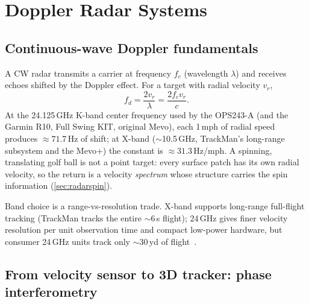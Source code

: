 \chapter{Doppler Radar Systems}
\label{ch:radar}

\section{Continuous-wave Doppler fundamentals}
\label{sec:cwdoppler}

A CW radar transmits a carrier at frequency $f_c$ (wavelength $\lambda$)
and receives echoes shifted by the Doppler effect. For a target with
radial velocity $v_r$,
\begin{equation}
\label{eq:doppler}
f_d = \frac{2 v_r}{\lambda} = \frac{2 f_c v_r}{c}.
\end{equation}
At the 24.125\,GHz K-band center frequency used by the OPS243-A (and the
Garmin R10, Full Swing KIT, original Mevo), each 1\,mph of radial speed
produces $\approx71.7$\,Hz of shift; at X-band ($\sim$10.5\,GHz, TrackMan's
long-range subsystem and the Mevo+) the constant is
$\approx31.3$\,Hz/mph. A spinning, translating golf ball is not a point
target: every surface patch has its own radial velocity, so the return is a
velocity \emph{spectrum} whose structure carries the spin information
(\cref{sec:radarspin}).

Band choice is a range-vs-resolution trade. X-band supports long-range
full-flight tracking (TrackMan tracks the entire $\sim$6\,s flight);
24\,GHz gives finer velocity resolution per unit observation time and
compact low-power hardware, but consumer 24\,GHz units track only
$\sim$30\,yd of flight~\cite{fccTman4,mevoteardown,garminr10data}.

\section{From velocity sensor to 3D tracker: phase interferometry}
\label{sec:interferometry}


